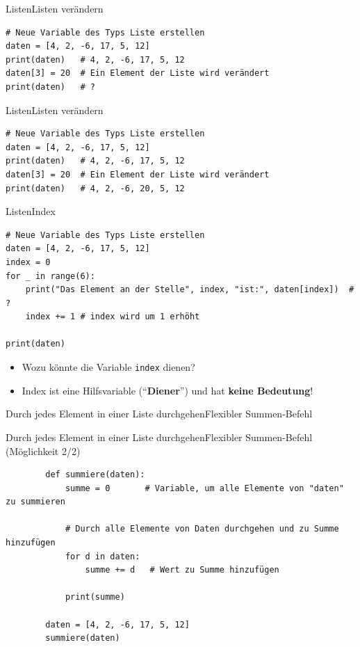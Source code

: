 \begin{frame}[fragile]{Listen}{Listen verändern}
	\begin{lstlisting}
# Neue Variable des Typs Liste erstellen
daten = [4, 2, -6, 17, 5, 12] 
print(daten)   # 4, 2, -6, 17, 5, 12
daten[3] = 20  # Ein Element der Liste wird verändert
print(daten)   # ?
\end{lstlisting}
\end{frame}

\begin{frame}[fragile]{Listen}{Listen verändern}
	\begin{lstlisting}
# Neue Variable des Typs Liste erstellen
daten = [4, 2, -6, 17, 5, 12] 
print(daten)   # 4, 2, -6, 17, 5, 12
daten[3] = 20  # Ein Element der Liste wird verändert
print(daten)   # 4, 2, -6, 20, 5, 12
\end{lstlisting}
\end{frame}


\begin{frame}[fragile]{Listen}{Index}
	\begin{lstlisting}[basicstyle=\ttfamily\scriptsize]
# Neue Variable des Typs Liste erstellen
daten = [4, 2, -6, 17, 5, 12] 
index = 0
for _ in range(6):
	print("Das Element an der Stelle", index, "ist:", daten[index])  # ?
	index += 1 # index wird um 1 erhöht

print(daten)
\end{lstlisting}


	\begin{itemize}[<+->]
		\item Wozu könnte die Variable \lstinline|index| dienen?
		\item Index ist eine Hilfsvariable (\enquote{\textbf{Diener}}) und hat \textbf{keine Bedeutung}!
	\end{itemize}
\end{frame}


\begin{frame}[fragile]{Durch jedes Element in einer Liste durchgehen}{Flexibler Summen-Befehl}
	
\end{frame}


\begin{frame}[fragile]{Durch jedes Element in einer Liste durchgehen}{Flexibler Summen-Befehl (Möglichkeit 2/2)}
	\begin{lstlisting}
		def summiere(daten):
			summe = 0       # Variable, um alle Elemente von "daten" zu summieren
		
			# Durch alle Elemente von Daten durchgehen und zu Summe hinzufügen
			for d in daten:
				summe += d   # Wert zu Summe hinzufügen
		
			print(summe)
		
		daten = [4, 2, -6, 17, 5, 12] 
		summiere(daten)
	\end{lstlisting}
\end{frame}

